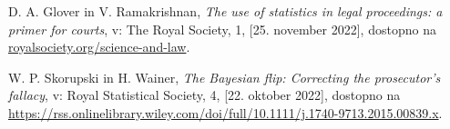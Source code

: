 \documentclass[12pt,a4paper]{amsart}
\theoremstyle{definition} %
\theoremstyle{plain} %
\begin{document}
\begin{thebibliography}{99}
        D. A. Glover in V. Ramakrishnan, \emph{The use of statistics in legal proceedings: a primer for courts}, v: The Royal Society, 1, [25. november 2022], dostopno na \url{royalsociety.org/science-and-law}.

        W. P. Skorupski in H. Wainer, \emph{The Bayesian flip: Correcting the prosecutor's fallacy}, v: Royal Statistical Society, 4, [22. oktober 2022], dostopno na \url{https://rss.onlinelibrary.wiley.com/doi/full/10.1111/j.1740-9713.2015.00839.x}.

\end{thebibliography}
\end{document}
